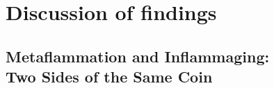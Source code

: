 
\clearpage

\section{Discussion of findings}

\subsection[Metaflammation and Inflammaging: Two Sides of the Same Coin]{Metaflammation and Inflammaging:\\Two Sides of the Same Coin}

\vspace{20pt}

